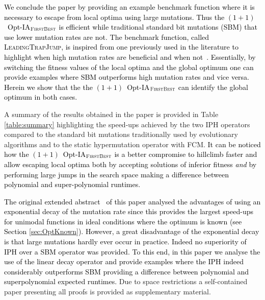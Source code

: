 \documentclass[lettersize,journal]{IEEEtran}
\newcommand{\new}[1]{\textcolor{black}{#1}}
\begin{document}
\new{We conclude the paper by providing an example benchmark function where it is necessary to escape from local optima using large mutations. Thus the $(1+1)$~Opt-IA$_{\textsc{FirstBest}}$ is efficient while traditional standard bit mutations (SBM) that use lower mutation rates are not. The benchmark function, called \textsc{LeadingTrapJump}, is inspired from one previously used in the literature to highlight when high mutation rates are beneficial and when not~\cite{OlivetoLehreNeumann09}. Essentially, by switching the fitness values of the local optima and the global optimum one can provide examples where SBM outperforms high mutation rates and vice versa. Herein we show that the the $(1+1)$~Opt-IA$_{\textsc{FirstBest}}$ can identify the global optimum in both cases.}



A summary of the results obtained in the paper is provided in Table \ref{table:summary} highlighting the speed-ups achieved by the two IPH operators compared to the standard bit mutations traditionally  used by evolutionary algorithms and to the static hypermutation operator with FCM.
\new{It can be noticed how the $(1+1)$~Opt-IA$_{\textsc{FirstBest}}$ is a better compromise to hillclimb faster and allow escaping local optima both by accepting solutions of inferior fitness {\it and} by performing large jumps in the search space making a difference between polynomial and super-polynomial runtimes.}

\new{The original extended abstract~\cite{CorusOlivetoYazdaniIPH2019} of this paper analysed the advantages of using an exponential decay of the mutation rate since this provides the largest speed-ups for unimodal functions in ideal conditions where the optimum is known (see Section \ref{sec:OptKnown}). However, a great disadvantage of the exponential decay is that large mutations hardly ever occur in practice. Indeed no superiority of IPH over a SBM operator was provided.  To this end, in this paper we analyse the use of the linear decay operator and  provide examples where the IPH indeed considerably outperforms SBM providing a difference between polynomial and superpolynomial expected runtimes.}
Due to space restrictions a self-contained paper presenting all proofs is provided as supplementary material.



 
 
 
\end{document}

